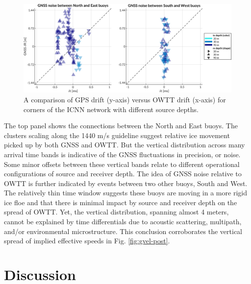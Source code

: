 \begin{figure}[h!]
	\centering
	\includegraphics[width=\columnwidth]{figs/gps-drift-example.pdf} 
	\caption{A comparison of GPS drift (y-axis) versus OWTT drift (x-axis) for corners of the ICNN network with different source depths.}
	\label{fig:gps-drift-example}
\end{figure}

The top panel shows the connections between the North and East buoys.
The clusters scaling along the 1440 m/s guideline suggest relative ice movement picked up by both GNSS and OWTT.
But the vertical distribution across many arrival time bands is indicative of the GNSS fluctuations in precision, or noise.
Some minor offsets between these vertical bands relate to different operational configurations of source and receiver depth.
The idea of GNSS noise relative to OWTT is further indicated by events between two other buoys, South and West.
The relatively thin time window suggests these buoys are moving in a more rigid ice floe and that there is minimal impact by source and receiver depth on the spread of OWTT.
Yet, the vertical distribution, spanning almost 4 meters, cannot be explained by time differentials due to acoustic scattering, multipath, and/or environmental microstructure.
This conclusion corroborates the vertical spread of implied effective speeds in Fig. \ref{fig:gvel-post}.

\clearpage
\section{Discussion}


